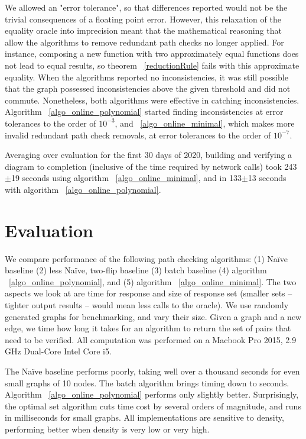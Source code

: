 \documentclass[sigplan,review,anonymous]{acmart}
\begin{document}
{We allowed an "error tolerance", so that differences reported would not be the trivial consequences of a floating point error.
However, this relaxation of the equality oracle into imprecision meant that the mathematical reasoning that allow the algorithms to remove redundant path checks no longer applied.
For instance, composing a new function with two approximately equal functions does not lead to equal results, so theorem ~\ref{reductionRule} fails with this approximate equality.
When the algorithms reported no inconsistencies, it was still possible that the graph possessed inconsistencies above the given threshold and did not commute.
Nonetheless, both algorithms were effective in catching inconsistencies. Algorithm ~\ref{algo_online_polynomial} started finding inconsistencies at error tolerances to the order of $10^{-3}$, and ~\ref{algo_online_minimal}, which makes more invalid redundant path check removals, at error tolerances to the order of $10^{-7}$.

Averaging over evaluation for the first 30 days of 2020, building and verifying a diagram to completion (inclusive of the time required by network calls) took 243$\pm$19 seconds using algorithm ~\ref{algo_online_minimal}, and in 133$\pm$13 seconds with algorithm ~\ref{algo_online_polynomial}. 

\section{Evaluation}
\label{sec:evaluation}
We compare performance of the following path checking algorithms: (1) Na\"{i}ve baseline (2) less Na\"{i}ve, two-flip baseline (3) batch baseline (4) algorithm ~\ref{algo_online_polynomial}, and (5) algorithm ~\ref{algo_online_minimal}.
The two aspects we look at are time for response and size of response set (smaller sets -- tighter output results -- would mean less calls to the oracle).
We use randomly generated graphs for benchmarking, and vary their size.
Given a graph and a new edge, we time how long it takes for an algorithm to return  the set of pairs that need to be verified.
All computation was performed on a Macbook Pro 2015, 2.9 GHz Dual-Core Intel Core i5.

The Na\"{i}ve baseline performs poorly, taking well over a thousand seconds for even small graphs of 10 nodes.
The batch algorithm brings timing down to seconds. Algorithm ~\ref{algo_online_polynomial} performs only slightly better.
Surprisingly, the optimal set algorithm cuts time cost by several orders of magnitude, and runs in milliseconds for small graphs.
All implementations are sensitive to density, performing better when density is very low or very high.

}
\end{document}
